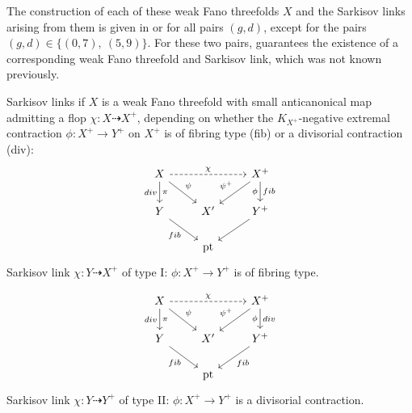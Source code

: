 \documentclass[english,11pt,reqno]{amsart}
\begin{document}
%
The construction of each of these weak Fano threefolds $X$ and the Sarkisov links arising from them is given in \cite{Weak_Fano_threefolds_II-Jahnke_Peternell_Radloff} or \cite{Takeuchi-Weak_Fano_threefolds_del_Pezzo_fibration} for all pairs $(g,d)$, except for the pairs $(g,d)\in \{(0,7),\:(5,9)\}$. For these two pairs,  guarantees the existence of a corresponding weak Fano threefold and Sarkisov link, which was not known previously. \\
%

\begin{minipage}{\textwidth }
\vspace{1cm}
\centering
Sarkisov links if $X$ is a weak Fano threefold with small anticanonical map admitting a flop $\chi:X\dashrightarrow X^+$, depending on whether the $K_{X^+}$-negative extremal contraction $\phi:X^+\rightarrow Y^+$ on $X^+$ is of fibring type (fib) or a divisorial contraction (div):\\
\begin{equation*}
\begin{tikzcd} 
X \ar[d, "div"', "\pi"] \ar[dr, "\psi"] \ar[rr, "\chi",dashed]&& X^+ \ar[dl, "\psi^+"']\ar[d, "\phi"', "fib"] \\
Y \ar[dr, "fib"']
& X' & Y^+ \ar[dl,]\\
&\textup{pt} &
\end{tikzcd} 
\end{equation*}	
Sarkisov link $\chi:Y\dashrightarrow X^+$ of type I: $\phi:X^+ \rightarrow Y^+$ is of fibring type.

\begin{equation*}
\begin{tikzcd}
X \ar[d, "div"', "\pi"] \ar[dr, "\psi"] \ar[rr, "\chi",dashed]&& X^+ \ar[dl, "\psi^+"']\ar[d, "\phi"', "div"] \\
Y \ar[dr, "fib"']
& X' & Y^+ \ar[dl,"fib"]\\
&\textup{pt} &
\end{tikzcd}
\end{equation*}
Sarkisov link $\chi:Y\dashrightarrow Y^+$ of type II: $\phi:X^+\rightarrow Y^+$ is a divisorial contraction.
\end{minipage}\\
%
%
\vspace{-0.5cm}
%
%
\end{document}
